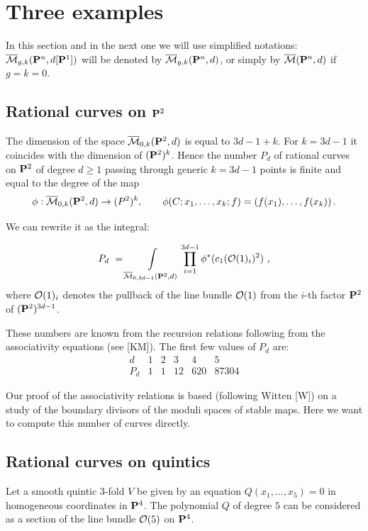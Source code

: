 \documentclass{amsart}
\begin{document}
\section{Three examples}

In this section and in the next one we
 will use  simplified notations:
$\M_{g,k}(\P^n,d[\P^1])$ will be denoted by
 $\M_{g,k}(\P^n,d)$, or simply by $\M(\P^n,d)$ if $g=k=0$.

\subsection{Rational curves on $\P^2$}

The dimension of the space $\M_{0,k}(\P^2,d)$ is equal to $3d-1+k$.
 For $k=3d-1$ it coincides with the dimension of $(\P^2)^k$.
 Hence
the number $P_d$ of rational curves on $\P^2$ of degree
$d\ge 1$ passing through generic $k=3d-1$ points is finite and equal to the
degree of the map $$\phi:\M_{0,k}(\P^2,d)\to (P^2)^k,\qquad
 \phi(C; {x_1,\dots,x_k};f)=(f(x_1),\dots,f(x_k))\,.$$

 We can rewrite it as the integral:

$$P_d\,\,=\int\limits_{\M_{0,3d-1}(\P^2,d)}\prod_{i=1}^{3d-1}\phi^*(c_1(\O(1)_i)^2)\,\,,$$
where $\O(1)_i$ denotes the pullback of the line bundle $\O(1)$ from the $i$-th
factor $\P^2$ of $(\P^2)^{3d-1}$.

These numbers are known from the recursion relations following from
the associativity equations (see [KM]).
 The first few values of $P_d$ are:
$$\begin{matrix}
d & 1 & 2 & 3 & 4 &5\\
P_d& 1 & 1& 12& 620&87304
\end{matrix}$$




Our proof of the associativity relations is based (following Witten [W]) on a
study of the boundary divisors of the moduli spaces of stable maps.
 Here we want to compute this number of curves directly.

\subsection{Rational curves on quintics}

 Let a smooth quintic 3-fold $V$ be given by an equation
$Q(x_1,\dots,x_5)=0$ in homogeneous coordinates in $\P^4$.
 The polynomial $Q$ of degree $5$ can be considered as a section
 of the line bundle $\O(5)$ on $\P^4$.
\end{document}
